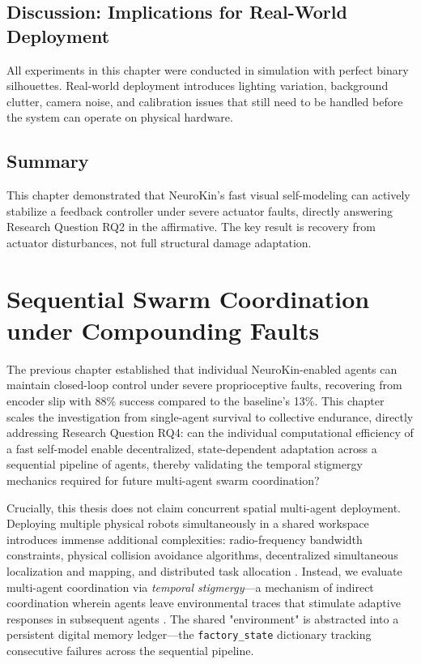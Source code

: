 \documentclass[12pt,a4paper,oneside]{report}
\begin{document}
\section{Discussion: Implications for Real-World Deployment}

All experiments in this chapter were conducted in simulation with perfect binary silhouettes. Real-world deployment introduces lighting variation, background clutter, camera noise, and calibration issues that still need to be handled before the system can operate on physical hardware.

\section{Summary}

This chapter demonstrated that NeuroKin's fast visual self-modeling can actively stabilize a feedback controller under severe actuator faults, directly answering Research Question RQ2 in the affirmative. The key result is recovery from actuator disturbances, not full structural damage adaptation.







\chapter{Sequential Swarm Coordination under Compounding Faults}

The previous chapter established that individual NeuroKin-enabled agents can maintain closed-loop control under severe proprioceptive faults, recovering from encoder slip with 88\% success compared to the baseline's 13\%. This chapter scales the investigation from single-agent survival to collective endurance, directly addressing Research Question RQ4: can the individual computational efficiency of a fast self-model enable decentralized, state-dependent adaptation across a sequential pipeline of agents, thereby validating the temporal stigmergy mechanics required for future multi-agent swarm coordination?

Crucially, this thesis does not claim concurrent spatial multi-agent deployment. Deploying multiple physical robots simultaneously in a shared workspace introduces immense additional complexities: radio-frequency bandwidth constraints, physical collision avoidance algorithms, decentralized simultaneous localization and mapping, and distributed task allocation \cite{matsuki2024gaussian, keetha2024splattam}. Instead, we evaluate multi-agent coordination via \textit{temporal stigmergy}—a mechanism of indirect coordination wherein agents leave environmental traces that stimulate adaptive responses in subsequent agents \cite{bongard2006resilient}. The shared "environment" is abstracted into a persistent digital memory ledger—the \texttt{factory\_state} dictionary tracking consecutive failures across the sequential pipeline.
\end{document}
